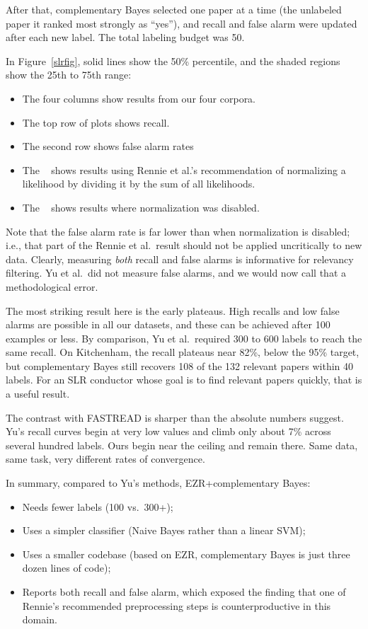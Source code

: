 \documentclass[AMA,STIX2COL]{WileyNJDv5}
\begin{document}
{{After that,
complementary Bayes selected one paper at a time (the unlabeled paper
it ranked most strongly as ``yes''), and recall and false alarm were
updated after each new label. The total labeling budget was 50. 


 

In  Figure~\ref{slrfig}, 
solid lines show the 50\% percentile, and the shaded
regions show the 25th to 75th range:
\begin{itemize}
\item
The four columns show results from our four 
corpora.
\item
The top row
of plots shows recall.
\item
The second row shows  false alarm rates
\item The 
 \color{ruby}{\bf red lines}\color{black}~ shows results using
 Rennie et al.'s recommendation of normalizing a likelihood
 by dividing it by the sum of all likelihoods.
 \item
 The  \color{slateblue}{\bf blue lines}\color{black}~
 shows results where normalization was disabled.
 \end{itemize}
Note that the false alarm rate is far lower than
 when normalization is disabled; i.e., that part of
 the Rennie et al.\ result should not be applied
 uncritically to new data.
Clearly,  measuring {\em both} recall and false
alarms is informative for relevancy filtering.
 Yu et al.\ did not measure false alarms, and we would now
 call that a methodological error.
  
The most striking result here is the early plateaus.
High recalls and low false alarms are possible in all our 
datasets, and these can be achieved after 100 examples or less. By comparison, Yu et al.\ required 300 to 600   labels to reach the
same recall. On Kitchenham, the recall plateaus near 82\%, below
the 95\% target, but complementary Bayes still recovers 108 of the 132 relevant
papers within 40 labels. For an SLR conductor whose goal is to
find relevant papers quickly, that is a useful result.

The contrast with FASTREAD is sharper than the absolute numbers
suggest. Yu's recall curves begin at very low values and climb
only about 7\% across several hundred labels. Ours begin near
the ceiling and remain there. Same data, same task, very
different rates of convergence.

In summary, compared to Yu's methods, EZR+complementary Bayes:
\begin{itemize}
\item Needs fewer labels (100 vs.\ 300+);
\item Uses a simpler classifier (Naive Bayes rather than a
  linear SVM);
\item Uses a smaller codebase (based on EZR, complementary
Bayes is just three dozen lines of code);
\item Reports both recall and false alarm, which exposed the
  finding that one of Rennie's recommended preprocessing
  steps is counterproductive in this domain.
\end{itemize}

}}
\end{document}

